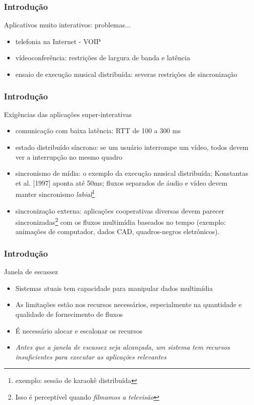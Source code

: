 \documentclass[]{beamer}
\begin{document}
\begin{frame}
  \frametitle{Introdução}
Aplicativos muito interativos: problemas...
\begin{itemize}
  \item telefonia na Internet - VOIP
  \item vídeoconferência: restrições de largura de banda e latência
  \item ensaio de execução musical distribuída: severas restrições de sincronização
\end{itemize}
\end{frame}

\begin{frame}
  \frametitle{Introdução}
Exigências das aplicações super-interativas
\begin{itemize}
  \item comunicação com baixa latência: RTT de 100 a 300 ms
  \item estado distribuído síncrono: se um usuário interrompe um vídeo, todos devem 
ver a interrupção no mesmo quadro
  \item sincronismo de mídia: o exemplo da execução musical distribuída; 
Konstantas et al. [1997] aponta até 50ms; fluxos separados de áudio e vídeo devem manter
sincronismo \emph{labial}\footnote{exemplo: sessão de karaokê distribuída}
  \item sincronização externa: aplicações cooperativas diversas devem parecer 
sincronizadas\footnote{Isso é perceptível quando \emph{filmamos a televisão}}
com os fluxos multimídia baseados no tempo (exemplo: animações de computador, dados CAD, 
quadros-negros eletrônicos).
\end{itemize}
\end{frame}

\begin{frame}
  \frametitle{Introdução}
Janela de escassez
\begin{itemize}
  \item Sistemas atuais tem capacidade para manipular dados multimídia
  \item As limitações estão nos recursos necessários, especialmente 
na quantidade e qualidade de fornecimento de fluxos
  \item É necessário alocar e escalonar os recursos
  \item \emph{Antes que a janela de escassez seja alcançada, 
um sistema tem recursos insuficientes para executar as aplicações relevantes}
\end{itemize}
\end{frame}
\end{document}

